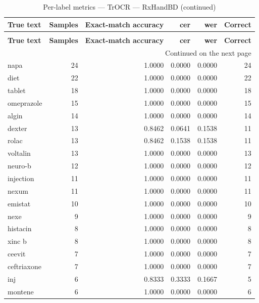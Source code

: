 \begingroup
\setlength{\tabcolsep}{2.5pt}
\renewcommand{\arraystretch}{1.05}
\sloppy
\scriptsize
\begin{longtable}{p{3.0cm}rrrrr}
\caption{Per-label metrics — TrOCR — RxHandBD}\label{tab:e3-02_trocr_evaluation-per-label}\\
\toprule
\textbf{True text} & \textbf{Samples} & \textbf{Exact-match accuracy} & \textbf{cer} & \textbf{wer} & \textbf{Correct} \\
\midrule
\endfirsthead
\caption*{Per-label metrics — TrOCR — RxHandBD (continued)}\\
\toprule
\textbf{True text} & \textbf{Samples} & \textbf{Exact-match accuracy} & \textbf{cer} & \textbf{wer} & \textbf{Correct} \\
\midrule
\endhead
\midrule
\multicolumn{6}{r}{Continued on the next page}\\
\endfoot
\bottomrule
\endlastfoot
napa & 24 & 1.0000 & 0.0000 & 0.0000 & 24 \\
diet & 22 & 1.0000 & 0.0000 & 0.0000 & 22 \\
tablet & 18 & 1.0000 & 0.0000 & 0.0000 & 18 \\
omeprazole & 15 & 1.0000 & 0.0000 & 0.0000 & 15 \\
algin & 14 & 1.0000 & 0.0000 & 0.0000 & 14 \\
dexter & 13 & 0.8462 & 0.0641 & 0.1538 & 11 \\
rolac & 13 & 0.8462 & 0.1538 & 0.1538 & 11 \\
voltalin & 13 & 1.0000 & 0.0000 & 0.0000 & 13 \\
neuro-b & 12 & 1.0000 & 0.0000 & 0.0000 & 12 \\
injection & 11 & 1.0000 & 0.0000 & 0.0000 & 11 \\
nexum & 11 & 1.0000 & 0.0000 & 0.0000 & 11 \\
emistat & 10 & 1.0000 & 0.0000 & 0.0000 & 10 \\
nexe & 9 & 1.0000 & 0.0000 & 0.0000 & 9 \\
histacin & 8 & 1.0000 & 0.0000 & 0.0000 & 8 \\
xinc b & 8 & 1.0000 & 0.0000 & 0.0000 & 8 \\
ceevit & 7 & 1.0000 & 0.0000 & 0.0000 & 7 \\
ceftriaxone & 7 & 1.0000 & 0.0000 & 0.0000 & 7 \\
inj & 6 & 0.8333 & 0.3333 & 0.1667 & 5 \\
montene & 6 & 1.0000 & 0.0000 & 0.0000 & 6 \\

\end{longtable}
